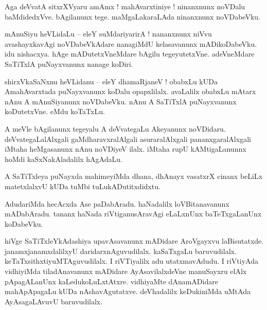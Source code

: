 \documentclass{article}
\begin{document}
\begin{mn}%
Aga deVvatA sitxrXVyaru amAmx ! mahAvarxtiniye ! ninanxnunx noVDalu baMdidedxVve. bAgilanunx tege. 
maMgaLakaraLAda ninanxnunx noVDabeVku.
\end{mn}

\begin{mn}%
mAnuSiyu heVLidaLu -- eleY suMdariyarirA ! nananxnunx niVvu avashayxkavAgi noVDabeVkAdare nanagiMdU 
kelasavanunx mADikoDabeVku. idu nishacxya. hAge mADutetxVneMdare bAgilu tegeyutetxVne. adeVneMdare 
SaTiTxlA puNayxvanunx nanage koDiri.
\end{mn}

\begin{mn}%
shirxVkaSaNxnu heVLidanu -- eleY dhamaRjaneV ! obabxLu kUDa AmahAvarxtada puNayxvanunx koDalu 
opapxlilalx. avaLalilx obabxLu mAtarx nAnu A mAnuSiyanunx noVDabeVku. nAnu A SaTiTxlA puNayxvanunx 
koDutetxVne. eMdu koTaTxLu.
\end{mn}

\begin{mn}%
A meVle bAgilanunx tegeyalu A deVvategaLu Akeyanunx noVDidaru. deVvategaLalAlxgali 
gaMdharavxralAlgali asuraralAlxgali pananxgaralAlxgali iMtaha heMgasanunx nAnu noVDiyeV ilalx. 
iMtaha rupU kAMtigaLanunnx hoMdi kaSxNakAladalilx hAgAdaLu.
\end{mn}

\begin{mn}%
A SaTiTxleya puNayxda mahimeyiMda dhana, dhAnayx vasatxrX cinanx beLiLx matetxlalxvU kUDa tuMbi 
tuLukADutitxdidxtu.
\end{mn}

\begin{mn}%
AdudariMda hecAcxda Ase paDabAradu. haNadalilx loVBitanavanunx mADabAradu. tananx haNada 
riVtiganusAravAgi eLaLxnUnx baTeTxgaLanUnx koDabeVku.
\end{mn}

\begin{mn}%
hiVge SaTiTxleYkAdashiya upavAsavanunx mADidare AroVgayxvu laBisutatxde. janamxjanamxdalilxyU 
daridarxnAguvudilalx. kaSaTxgaLu baruvudilalx. keTaTxsithxtiyuMTAguvudilalx. I riVTiyalilx adu 
utatxmavAdudu. I riVtiyAda vidhiyiMda tiladAnavanunx mADidare AyAsavilalxdeVne manuSayxru elAlx 
pApagALanUnx kaLedukoLuLxtAtxre. vidhiyaMte dAnamADidare mahApApagaLu kUDa nAshavAgutatxve. 
deVhadalilx keDukiniMda uMtAda AyAsagaLAvuvU baruvudilalx.
\end{mn}

\end{document}
